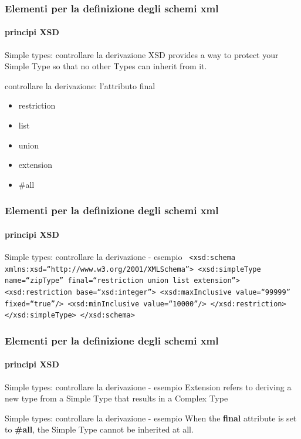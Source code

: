 \begin{frame}
	\frametitle{Elementi per la definizione degli schemi xml}
	\framesubtitle{principi XSD}
	\addtocounter{nframe}{1}

	\begin{block}{Simple types: controllare la derivazione}
		XSD provides a way to protect your Simple Type so that no other Types can inherit from it.

	\end{block}

	\begin{block}{controllare la derivazione: l'attributo final}
		\begin{itemize}
			\item restriction
			\item list
			\item union
			\item extension
			\item \#all
		\end{itemize}
	\end{block}

\end{frame}


\begin{frame}
	\frametitle{Elementi per la definizione degli schemi xml}
	\framesubtitle{principi XSD}
	\addtocounter{nframe}{1}

	\begin{block}{Simple types: controllare la derivazione - esempio}
		\texttt{
			<xsd:schema xmlns:xsd=``http://www.w3.org/2001/XMLSchema''>
			<xsd:simpleType name=``zipType''
			final=``restriction union list extension''>
			<xsd:restriction base=``xsd:integer''>
			<xsd:maxInclusive value=``99999'' fixed=``true''/>
			<xsd:minInclusive value=``10000''/>
			</xsd:restriction>
			</xsd:simpleType>
			</xsd:schema>
		}
	\end{block}

\end{frame}

\begin{frame}
	\frametitle{Elementi per la definizione degli schemi xml}
	\framesubtitle{principi XSD}
	\addtocounter{nframe}{1}

	\begin{block}{Simple types: controllare la derivazione - esempio}
		Extension refers to deriving a new type from a Simple Type that results in a Complex Type
	\end{block}

	\begin{block}{Simple types: controllare la derivazione - esempio}
		When the \textbf{final} attribute is set to \textbf{\#all}, the Simple Type cannot be inherited at all.
	\end{block}

\end{frame}


